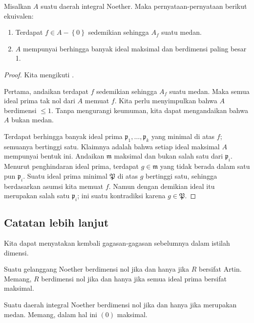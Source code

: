 \begin{theorem}
Misalkan $A$ suatu daerah integral Noether. Maka pernyataan-pernyataan berikut ekuivalen:
\begin{enumerate}
\item Terdapat $f \in A-\left\{0\right\} $ sedemikian sehingga $A_f$ suatu medan.
\item $A$ mempunyai berhingga banyak ideal maksimal dan berdimensi paling besar 1.
\end{enumerate}
\end{theorem} 
\begin{proof} Kita mengikuti \cite{EGA}.

Pertama, andaikan terdapat $f$ sedemikian sehingga $A_f$ suatu medan. 
Maka semua ideal prima tak nol dari $A$ memuat $f$. 
Kita perlu menyimpulkan bahwa $A$ berdimensi $\leq 1$. Tanpa mengurangi keumuman,
kita dapat mengandaikan bahwa $A$ bukan medan.

Terdapat berhingga banyak ideal prima $\mathfrak{p}_1,\dots, \mathfrak{p}_k$ yang
minimal di atas $f$; semuanya bertinggi satu. Klaimnya adalah bahwa setiap ideal maksimal $A$ mempunyai
bentuk ini. Andaikan $\mathfrak{m}$ maksimal dan bukan salah satu dari $\mathfrak{p}_i$.
Menurut penghindaran ideal prima, terdapat $g \in \mathfrak{m}$ yang
tidak berada dalam satu pun $\mathfrak{p}_i$. Suatu ideal prima minimal $\mathfrak{P}$ di atas $g$ bertinggi
satu, sehingga berdasarkan asumsi kita memuat $f$. Namun dengan demikian ideal itu merupakan salah satu
$\mathfrak{p}_i$; ini suatu kontradiksi karena $g \in \mathfrak{P}$.
\end{proof} 


\subsection{Catatan lebih lanjut}

Kita dapat menyatakan kembali gagasan-gagasan sebelumnya dalam istilah dimensi.
\begin{remark} 
Suatu gelanggang Noether berdimensi nol jika dan hanya jika $R$ bersifat Artin. Memang,
$R$ berdimensi nol jika dan hanya jika semua ideal prima bersifat maksimal.
\end{remark} 


\begin{remark} 
Suatu daerah integral Noether berdimensi nol jika dan hanya jika merupakan medan. Memang, dalam hal ini
$(0)$ maksimal.
\end{remark} 

